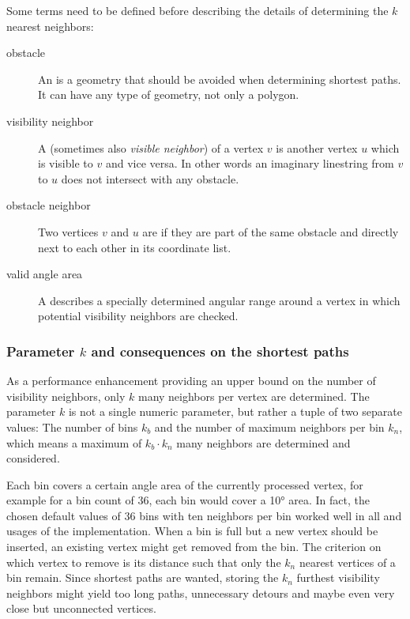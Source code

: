 			Some terms need to be defined before describing the details of determining the $k$ nearest neighbors:
			\begin{description}
				\item[obstacle] An  is a geometry that should be avoided when determining shortest paths. It can have any type of geometry, not only a polygon.
				\item[visibility neighbor] A  (sometimes also \emph{visible neighbor}) of a vertex $v$ is another vertex $u$ which is visible to $v$ and vice versa. In other words an imaginary linestring from $v$ to $u$ does not intersect with any obstacle.
				\item[obstacle neighbor] Two vertices $v$ and $u$ are  if they are part of the same obstacle and directly next to each other in its coordinate list.
				\item[valid angle area] A  describes a specially determined angular range around a vertex in which potential visibility neighbors are checked.
			\end{description}
		
		\subsubsection{Parameter $k$ and consequences on the shortest paths}
		
			As a performance enhancement providing an upper bound on the number of visibility neighbors, only $k$ many neighbors per vertex are determined.
			The parameter $k$ is not a single numeric parameter, but rather a tuple of two separate values:
			The number of bins $k_b$ and the number of maximum neighbors per bin $k_n$, which means a maximum of $k_b \cdot k_n$ many neighbors are determined and considered.
			
			Each bin covers a certain angle area of the currently processed vertex, for example for a bin count of 36, each bin would cover a 10° area.
			In fact, the chosen default values of 36 bins with ten neighbors per bin worked well in all and usages of the implementation.
			When a bin is full but a new vertex should be inserted, an existing vertex might get removed from the bin.
			The criterion on which vertex to remove is its distance such that only the $k_n$ nearest vertices of a bin remain.
			Since shortest paths are wanted, storing the $k_n$ furthest visibility neighbors might yield too long paths, unnecessary detours and maybe even very close but unconnected vertices.
			
